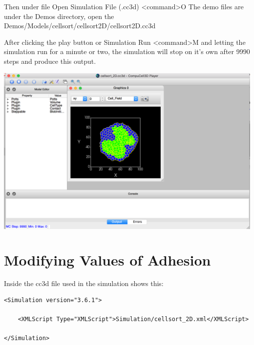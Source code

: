 \documentclass{article}
\begin{document}
Then under file \textrightarrow Open Simulation File (.cc3d) \textless command\textgreater O
The demo files are under the Demos directory, open the Demos/Models/cellsort/cellsort\textunderscore 2D/cellsort\textunderscore 2D.cc3d

\newpage
After clicking the play button or Simulation \textrightarrow Run \textless command\textgreater M and letting the simulation run for a minute or two, the simulation will stop on it's own after 9990 steps and produce this output.

{\includegraphics[width=\textwidth]{cellsort2d}
\centering}

\newpage
\section{Modifying Values of Adhesion}
Inside the cc3d file used in the simulation shows this:
\lstset{language=XML}
\begin{lstlisting}
<Simulation version="3.6.1">

    <XMLScript Type="XMLScript">Simulation/cellsort_2D.xml</XMLScript>

</Simulation>
\end{lstlisting}
\end{document}
